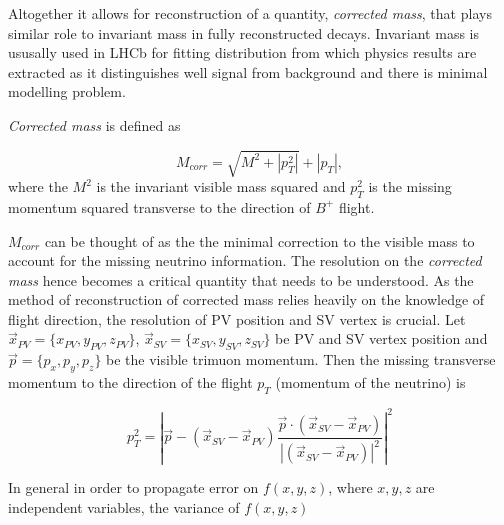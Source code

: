 Altogether it allows for reconstruction of a quantity, \textit{corrected mass}, that plays similar role to invariant mass in fully reconstructed decays. Invariant mass is ususally used in \Gls{LHCb} for fitting distribution from which physics results are extracted as it distinguishes well signal from background and there is minimal modelling problem.

\textit{Corrected mass} is defined as

\begin{equation}
	M_{corr} = \sqrt{{M}^{2} + |p^{2}_{T}|} + |p_{T}|,
\end{equation}	
where the $M^{2}$ is the invariant visible mass squared and $p^{2}_{T}$ is the missing momentum squared transverse to the direction of $B^{+}$ flight.


$M_{corr}$ can be thought of as the the minimal correction to the visible mass to account for the missing neutrino information. The resolution on the \textit{corrected mass} hence becomes a critical quantity that needs to be understood. As the method of reconstruction of corrected mass relies heavily on the knowledge of \Bpm flight direction, the resolution of \Gls{PV} position and \Gls{SV} vertex is crucial. Let $\overrightarrow{{x}}_{PV}=\{x_{PV},y_{PV},z_{PV}\}$, $\overrightarrow{{x}}_{SV}=\{x_{SV},y_{SV},z_{SV}\} $ be \Gls{PV} and \Gls{SV} vertex position and $\overrightarrow{p}=\{p_{x},p_{y},p_{z}\}$ be the visible trimuon momentum. Then the missing transverse momentum to the direction of the flight $p_{T}$ (momentum of the neutrino) is


\begin{equation}
	p^{2}_{T} = |\overrightarrow{p} - (\overrightarrow{{x}}_{SV}-\overrightarrow{{x}}_{PV})\frac{\overrightarrow{p} \cdot(\overrightarrow{{x}}_{SV}-\overrightarrow{{x}}_{PV})}{|(\overrightarrow{{x}}_{SV}-\overrightarrow{{x}}_{PV})|^{2}}|^{2}
\end{equation}

In general in order to propagate error on $f(x,y,z)$, where $x,y,z$ are independent variables, the variance of $f(x,y,z)$

